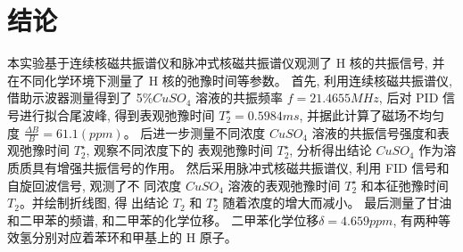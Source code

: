 \documentclass[12pt,a4paper]{article}
\begin{document}
\section{结论}
本实验基于连续核磁共振谱仪和脉冲式核磁共振谱仪观测了 H 核的共振信号, 并在不同化学环境下测量了 H 核的弛豫时间等参数。
首先, 利用连续核磁共振谱仪, 借助示波器测量得到了 5\%$CuS O_4$ 溶液的共振频率 $f = 21.4655 MHz$, 后对 PID 信号进行拟合尾波峰, 得到表观弛豫时间
$T_2^{\star} = 0.5984ms$, 并据此计算了磁场不均匀度 $\frac{\Delta B}{B}= 61.1(ppm)$。
后进一步测量不同浓度 $CuS O_4$ 溶液的共振信号强度和表观弛豫时间 $T_2^{\star}$, 观察不同浓度下的
表观弛豫时间 $T_2^{\star}$, 分析得出结论 $CuS O_4$ 作为溶质质具有增强共振信号的作用。
然后采用脉冲式核磁共振谱仪, 利用 FID 信号和自旋回波信号, 观测了不
同浓度 $CuS O_4$ 溶液的表观弛豫时间 $T_2^{\star}$ 和本征弛豫时间 $T_2$。并绘制折线图, 得
出结论 $T_2$ 和 $T_2^{\star}$ 随着浓度的增大而减小。
最后测量了甘油和二甲苯的频谱, 和二甲苯的化学位移。 二甲苯化学位移$\delta =4.659ppm$, 有两种等效氢分别对应着苯环和甲基上的 H 原子。
\end{document}
